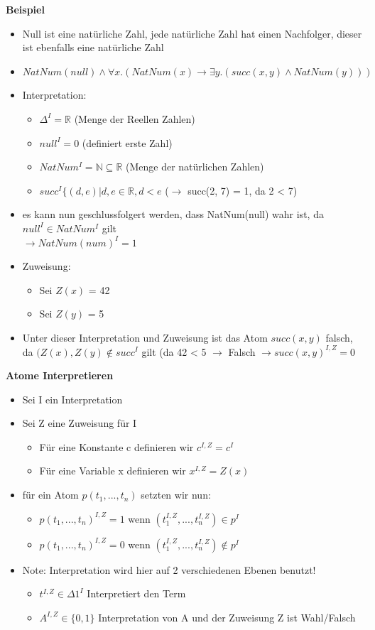 \documentclass[12pt,a4paper]{article}
\begin{document}
\textbf{Beispiel}
\begin{itemize}
\item Null ist eine natürliche Zahl, jede natürliche Zahl hat einen Nachfolger, dieser ist ebenfalls eine natürliche Zahl
\item $NatNum(null) \land \forall x. (NatNum(x) \rightarrow \exists y.(succ(x,y) \land NatNum(y)))$
\item Interpretation:
\begin{itemize}
\item $\Delta^I = \mathbb{R}$ (Menge der Reellen Zahlen)
\item $null^I = 0$ (definiert erste Zahl)
\item $NatNum^I = \mathbb{N} \subseteq \mathbb{R}$ (Menge der natürlichen Zahlen)
\item $succ^I \{(d,e) | d,e \in \mathbb{R}, d < e$ ($\rightarrow$ succ(2, 7) = 1, da 2 < 7)
\end{itemize}
\item es kann nun geschlussfolgert werden, dass NatNum(null) wahr ist, da $null^I \in NatNum^I$ gilt\\
$\rightarrow NatNum(num)^I = 1$
\item Zuweisung:
\begin{itemize}
\item Sei $Z(x)$ = 42
\item Sei $Z(y)$ = 5
\end{itemize}
\item Unter dieser Interpretation und Zuweisung ist das Atom $succ(x,y)$ falsch, da $(Z(x),Z(y) \not\in succ^I$ gilt (da 42 < 5 $\rightarrow$ Falsch $\rightarrow succ(x,y)^{I,Z} = 0$
\end{itemize}

\textbf{Atome Interpretieren}
\begin{itemize}
\item Sei I ein Interpretation
\item Sei Z eine Zuweisung für I
\begin{itemize}
\item Für eine Konstante c definieren wir $c^{I,Z} = c^I$
\item Für eine Variable x definieren wir $x^{I,Z} = Z(x)$
\end{itemize}
\item für ein Atom $p(t_1,...,t_n)$ setzten wir nun:
\begin{itemize}
\item $p(t_1,...,t_n)^{I,Z} = 1$ wenn $(t_1^{I,Z},...,t_n^{I,Z}) \in p^I$
\item $p(t_1,...,t_n)^{I,Z} = 0$ wenn $(t_1^{I,Z},...,t_n^{I,Z}) \not\in p^I$
\end{itemize}
\item Note: Interpretation wird hier auf 2 verschiedenen Ebenen benutzt!
\begin{itemize}
\item $t^{I,Z} \in \Delta1^I$ Interpretiert den Term
\item $A^{I,Z} \in \{0,1\}$ Interpretation von A und der Zuweisung Z ist Wahl/Falsch
\end{itemize}
\end{itemize}
\end{document}
